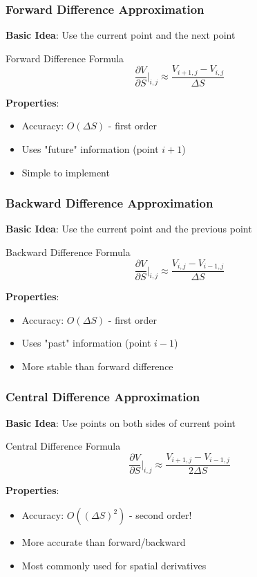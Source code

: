 \documentclass[aspectratio=169]{beamer}
\begin{document}
\begin{frame}
\frametitle{Forward Difference Approximation}
\textbf{Basic Idea}: Use the current point and the next point

\begin{block}{Forward Difference Formula}
\[\frac{\partial V}{\partial S} \bigg|_{i,j} \approx \frac{V_{i+1,j} - V_{i,j}}{\Delta S}\]
\end{block}

\textbf{Properties}:
\begin{itemize}
\item Accuracy: $O(\Delta S)$ - first order
\item Uses "future" information (point $i+1$)
\item Simple to implement
\end{itemize}
\end{frame}

\begin{frame}
\frametitle{Backward Difference Approximation}
\textbf{Basic Idea}: Use the current point and the previous point

\begin{block}{Backward Difference Formula}
\[\frac{\partial V}{\partial S} \bigg|_{i,j} \approx \frac{V_{i,j} - V_{i-1,j}}{\Delta S}\]
\end{block}

\textbf{Properties}:
\begin{itemize}
\item Accuracy: $O(\Delta S)$ - first order
\item Uses "past" information (point $i-1$)
\item More stable than forward difference
\end{itemize}
\end{frame}

\begin{frame}
\frametitle{Central Difference Approximation}
\textbf{Basic Idea}: Use points on both sides of current point

\begin{block}{Central Difference Formula}
\[\frac{\partial V}{\partial S} \bigg|_{i,j} \approx \frac{V_{i+1,j} - V_{i-1,j}}{2\Delta S}\]
\end{block}

\textbf{Properties}:
\begin{itemize}
\item Accuracy: $O((\Delta S)^2)$ - second order!
\item More accurate than forward/backward
\item Most commonly used for spatial derivatives
\end{itemize}
\end{frame}
\end{document}
